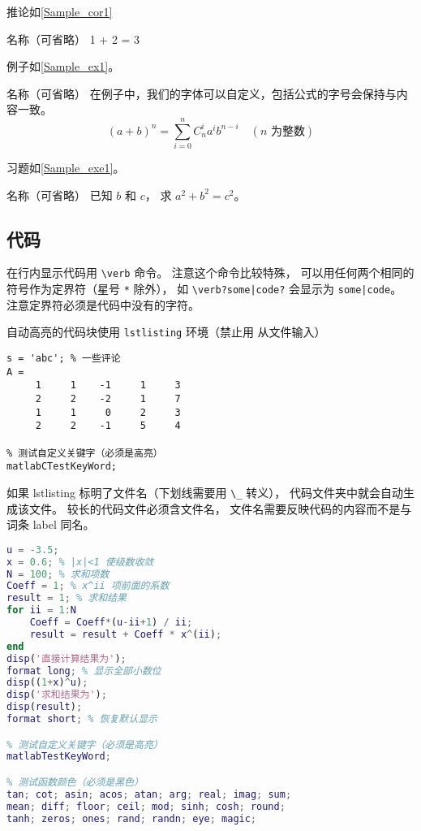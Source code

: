 推论如\autoref{Sample_cor1}
\begin{corollary}{名称（可省略）}\label{Sample_cor1}
1 + 2 = 3
\end{corollary}

例子如\autoref{Sample_ex1}。 
\begin{example}{名称（可省略）}\label{Sample_ex1}
在例子中，我们的字体可以自定义，包括公式的字号会保持与内容一致。
\begin{equation}
(a+b)^n = \sum_{i=0}^n C_n^i a^i b^{n-i} \quad (\text{$n$ 为整数})
\end{equation}
\end{example}

习题如\autoref{Sample_exe1}。 
\begin{exercise}{名称（可省略）}\label{Sample_exe1}
已知 $b$ 和 $c$， 求 $a^2 + b^2 = c^2$。
\end{exercise}

\subsection{代码}
在行内显示代码用 \verb|\verb| 命令。 注意这个命令比较特殊， 可以用任何两个相同的符号作为定界符（星号 \verb|*| 除外）， 如 \verb+\verb?some|code?+ 会显示为 \verb?some|code?。 注意定界符必须是代码中没有的字符。

自动高亮的代码块使用 \verb|lstlisting| 环境（禁止用 \verb|| 从文件输入）
\begin{lstlisting}[language=matlabC]
s = 'abc'; % 一些评论
A =
     1     1    -1     1     3
     2     2    -2     1     7
     1     1     0     2     3
     2     2    -1     5     4

% 测试自定义关键字（必须是高亮）
matlabCTestKeyWord;
\end{lstlisting}

如果 lstlisting 标明了文件名（下划线需要用 \verb|\_| 转义）， 代码文件夹中就会自动生成该文件。 较长的代码文件必须含文件名， 文件名需要反映代码的内容而不是与词条 label 同名。

\begin{lstlisting}[language=matlab, caption=sample\_code.m]
% 验证二项式定理(非整数幂)
u = -3.5;
x = 0.6; % |x|<1 使级数收敛
N = 100; % 求和项数
Coeff = 1; % x^ii 项前面的系数
result = 1; % 求和结果
for ii = 1:N
    Coeff = Coeff*(u-ii+1) / ii;
    result = result + Coeff * x^(ii);
end
disp('直接计算结果为');
format long; % 显示全部小数位
disp((1+x)^u);
disp('求和结果为');
disp(result);
format short; % 恢复默认显示

% 测试自定义关键字（必须是高亮）
matlabTestKeyWord;

% 测试函数颜色（必须是黑色）
tan; cot; asin; acos; atan; arg; real; imag; sum;
mean; diff; floor; ceil; mod; sinh; cosh; round;
tanh; zeros; ones; rand; randn; eye; magic;
\end{lstlisting}

